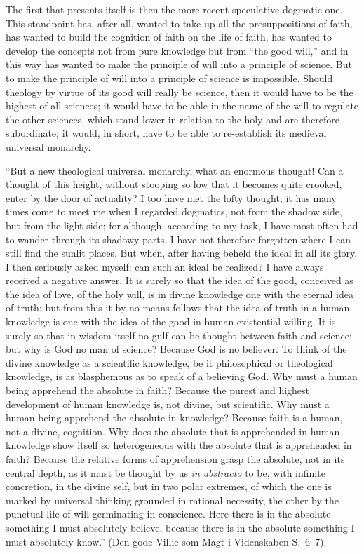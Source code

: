 \documentclass[12pt]{book}
\newcommand{\opage}[1]{\marginnote{\footnotesize\textit{[#1]}}}
\begin{document}
The first that presents itself is then the more recent
speculative-dogmatic one. This standpoint has, after all, wanted to take
up all the presuppositions of faith, has wanted to build the cognition
of faith on the life of faith, has wanted to develop the concepts not
from pure knowledge but from ``the good will,'' and in this way has
wanted to make the principle of will into a principle of science. But to
make the principle of will into a principle of science is impossible.
Should theology by virtue of its good will really be science, then it
would have to be the highest of all sciences; it would have to be able
in the name of the will to regulate the other sciences, which stand
lower in relation to the holy and are therefore
\opage{237}\setcounter{footnote}{0}%
subordinate; it would, in short, have to be able to re-establish its
medieval universal monarchy.

``But a new theological universal monarchy, what an enormous thought!
Can a thought of this height, without stooping so low that it becomes
quite crooked, enter by the door of actuality? I too have met the lofty
thought; it has many times come to meet me when I regarded dogmatics,
not from the shadow side, but from the light side; for although,
according to my task, I have most often had to wander through its
shadowy parts, I have not therefore forgotten where I can still find the
sunlit places. But when, after having beheld the ideal in all its
glory, I then seriously asked myself: can such an ideal be realized? I
have always received a negative answer. It is surely so that the idea of
the good, conceived as the idea of love, of the holy will, is in divine
knowledge one with the eternal idea of truth; but from this it by no
means follows that the idea of truth in a human knowledge is one with
the idea of the good in human existential willing. It is surely so that
in wisdom itself no gulf can be thought between faith and science: but
why is God no man of science? Because God is no believer. To think of
the divine knowledge as a scientific knowledge, be it philosophical or
theological knowledge, is as blasphemous as to speak of a believing God.
Why must a human being apprehend the absolute in faith? Because the
purest and highest development of human knowledge is, not divine, but
scientific.
Why must a human being apprehend the absolute in knowledge? Because
faith is a human, not a divine, cognition. Why does the absolute that is
apprehended in human knowledge show itself so heterogeneous with the
absolute that is apprehended
\opage{238}\setcounter{footnote}{0}%
in faith? Because the relative forms of apprehension grasp the
absolute, not in its central depth, as it must be thought by us
\textit{in abstracto} to be, with infinite concretion, in the divine
self, but in two polar extremes, of which the one is marked by universal
thinking grounded in rational necessity, the other by the punctual life
of will germinating in conscience. Here there is in the absolute
something I must absolutely believe, because there is in the absolute
something I must absolutely know.'' (Den gode Villie som Magt i
Videnskaben S.~6--7).
\end{document}
